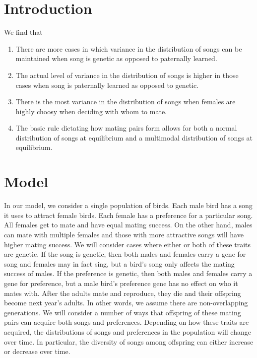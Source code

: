 \documentclass{article}
\begin{document}

\section*{Introduction}
We find that 
\begin{enumerate}
\item There are more cases in which variance in the distribution of songs can be maintained when song is genetic as opposed to paternally learned.
\item The actual level of variance in the distribution of songs is higher in those cases when song is paternally learned as opposed to genetic.
\item There is the most variance in the distribution of songs when females are highly choosy when deciding with whom to mate.
\item The basic rule dictating how mating pairs form allows for both a normal distribution of songs at equilibrium and a multimodal distribution of songs at equilibrium.
\end{enumerate}

\section*{Model}

In our model, we consider a single population of birds. Each male bird has a song it uses to attract female birds. Each female has a preference for a particular song. All females get to mate and have equal mating success. On the other hand, males can mate with multiple females and those with more attractive songs will have higher mating success. We will consider cases where either or both of these traits are genetic. If the song is genetic, then both males and females carry a gene for song and females may in fact sing, but a bird's song only affects the mating success of males. If the preference is genetic, then both males and females carry a gene for preference, but a male bird's preference gene has no effect on who it mates with. After the adults mate and reproduce, they die and their offspring become next year's adults. In other words, we assume there are non-overlapping generations. We will consider a number of ways that offspring of these mating pairs can acquire both songs and preferences. Depending on how these traits are acquired, the distributions of songs and preferences in the population will change over time. In particular, the diversity of songs among offspring can either increase or decrease over time.
\end{document}
